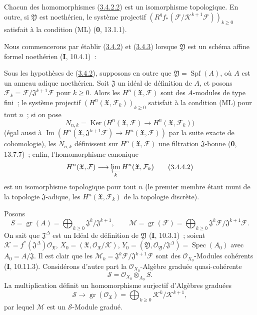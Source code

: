 \begin{corollary}[3.4.3]
\label{III.3.4.3-fr}
Chacun des homomorphismes (\hyperref[III.3.4.2.2-fr]{3.4.2.2}) est un
isomorphisme topologique. En outre, si $\mathfrak Y$ est noethérien, le
système projectif
$(R^qf_*(\mathcal F/\mathcal K^{k+1}\mathcal F))_{k\geq0}$ satisfait à la
condition \textup{(ML)} (\textbf{0}, 13.1.1).
\end{corollary}

Nous commencerons par établir (\hyperref[III.3.4.2-fr]{3.4.2}) et
(\hyperref[III.3.4.3-fr]{3.4.3}) lorsque $\mathfrak Y$ est un schéma affine
formel noethérien (\textbf{I}, 10.4.1)~:

\begin{corollary}[3.4.4]
\label{III.3.4.4-fr}
Sous les hypothèses de (\hyperref[III.3.4.2-fr]{3.4.2}), supposons en outre
que $\mathfrak Y=\operatorname{Spf}(A)$, où $A$ est un anneau adique
noethérien. Soit $\mathfrak J$ un idéal de définition de $A$, et posons
$\mathcal F_k=\mathcal F/\mathfrak J^{k+1}\mathcal F$ pour $k\geq0$. Alors
les $H^n(\mathfrak X,\mathcal F)$ sont des $A$-modules de type fini~; le
système projectif $(H^n(\mathfrak X,\mathcal F_k))_{k\geq0}$ satisfait à la
condition \textup{(ML)} pour tout $n$~; si on pose
\[
N_{n,k}=\operatorname{Ker}\bigl(H^n(\mathfrak X,\mathcal F)
\longrightarrow H^n(\mathfrak X,\mathcal F_k)\bigr)
\tag{3.4.4.1}\label{III.3.4.4.1-fr}
\]
(égal aussi à
$\operatorname{Im}(H^n(\mathfrak X,\mathfrak J^{k+1}\mathcal F)
\to H^n(\mathfrak X,\mathcal F))$ par la suite exacte de cohomologie), les
$N_{n,k}$ définissent sur $H^n(\mathfrak X,\mathcal F)$ une filtration
$\mathfrak J$-bonne (\textbf{0}, 13.7.7)~; enfin, l'homomorphisme canonique
\[
H^n(\mathfrak X,\mathcal F)
\longrightarrow\varprojlim_kH^n(\mathfrak X,\mathcal F_k)
\tag{3.4.4.2}\label{III.3.4.4.2-fr}
\]
est un isomorphisme topologique pour tout $n$ (le premier membre étant muni
de la topologie $\mathfrak J$-adique, les $H^n(\mathfrak X,\mathcal F_k)$ de
la topologie discrète).
\end{corollary}

Posons
\[
S=\operatorname{gr}(A)=\bigoplus_{k\geq0}
\mathfrak J^k/\mathfrak J^{k+1},\qquad
\mathcal M=\operatorname{gr}(\mathcal F)=\bigoplus_{k\geq0}
\mathfrak J^k\mathcal F/\mathfrak J^{k+1}\mathcal F.
\tag{3.4.4.3}\label{III.3.4.4.3-fr}
\]
On sait que $\mathfrak J^\Delta$ est un Idéal de définition de $\mathfrak Y$
(\textbf{I}, 10.3.1)~; soient
$\mathcal K=f^*(\mathfrak J^\Delta)\mathcal O_{\mathfrak X}$,
$X_0=(\mathfrak X,\mathcal O_{\mathfrak X}/\mathcal K)$,
$Y_0=(\mathfrak Y,\mathcal O_{\mathfrak Y}/\mathfrak J^\Delta)
=\operatorname{Spec}(A_0)$ avec $A_0=A/\mathfrak J$. Il est clair que les
$\mathcal M_k=\mathfrak J^k\mathcal F/\mathfrak J^{k+1}\mathcal F$ sont des
$\mathcal O_{X_0}$-Modules cohérents (\textbf{I}, 10.11.3). Considérons d'autre part la
$\mathcal O_{X_0}$-Algèbre graduée quasi-cohérente
\[
\mathcal S=\mathcal O_{X_0}\otimes_{A_0}S.
\tag{3.4.4.4}\label{III.3.4.4.4-fr}
\]
La multiplication définit un homomorphisme surjectif d'Algèbres graduées
\[
\mathcal S\longrightarrow
\operatorname{gr}(\mathcal O_{\mathfrak X})
=\bigoplus_{k\geq0}\mathcal K^k/\mathcal K^{k+1},
\]
par lequel $\mathcal M$ est un $\mathcal S$-Module gradué.

